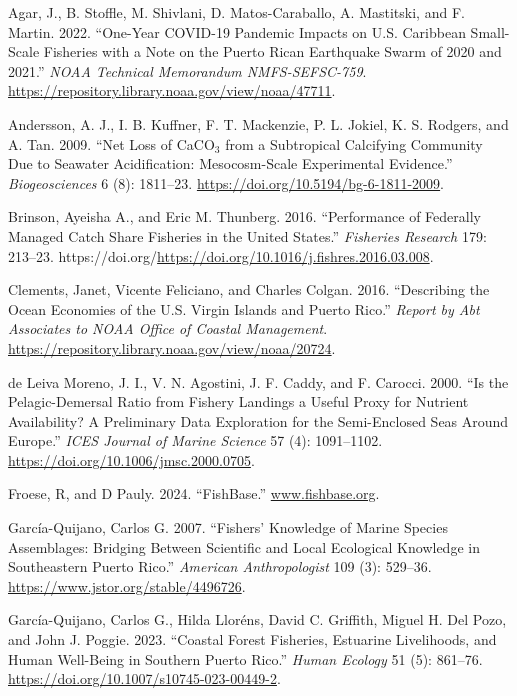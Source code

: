 \documentclass[
  letterpaper,
  oneside,
  open=any]{scrbook}
\newlength{\cslhangindent}
\newenvironment{CSLReferences}[2] %
 {\begin{list}{}{%
  \setlength{\itemindent}{0pt}
  \setlength{\leftmargin}{0pt}
  \setlength{\parsep}{0pt}
  \ifodd #1
   \setlength{\leftmargin}{\cslhangindent}
   \setlength{\itemindent}{-1\cslhangindent}
  \fi
  \setlength{\itemsep}{#2\baselineskip}}}
 {\end{list}}
\begin{document}
\label{refs}
\begin{CSLReferences}{1}{0}
Agar, J., B. Stoffle, M. Shivlani, D. Matos-Caraballo, A. Mastitski, and
F. Martin. 2022. {``One-Year COVID-19 Pandemic Impacts on U.S. Caribbean
Small-Scale Fisheries with a Note on the Puerto Rican Earthquake Swarm
of 2020 and 2021.''} \emph{NOAA Technical Memorandum NMFS-SEFSC-759}.
\url{https://repository.library.noaa.gov/view/noaa/47711}.

Andersson, A. J., I. B. Kuffner, F. T. Mackenzie, P. L. Jokiel, K. S.
Rodgers, and A. Tan. 2009. {``Net Loss of CaCO\(_{3}\) from a
Subtropical Calcifying Community Due to Seawater Acidification:
Mesocosm-Scale Experimental Evidence.''} \emph{Biogeosciences} 6 (8):
1811--23. \url{https://doi.org/10.5194/bg-6-1811-2009}.

Brinson, Ayeisha A., and Eric M. Thunberg. 2016. {``Performance of
Federally Managed Catch Share Fisheries in the United States.''}
\emph{Fisheries Research} 179: 213--23.
https://doi.org/\url{https://doi.org/10.1016/j.fishres.2016.03.008}.

Clements, Janet, Vicente Feliciano, and Charles Colgan. 2016.
{``Describing the Ocean Economies of the U.S. Virgin Islands and Puerto
Rico.''} \emph{Report by Abt Associates to NOAA Office of Coastal
Management}. \url{https://repository.library.noaa.gov/view/noaa/20724}.

de Leiva Moreno, J. I., V. N. Agostini, J. F. Caddy, and F. Carocci.
2000. {``Is the Pelagic-Demersal Ratio from Fishery Landings a Useful
Proxy for Nutrient Availability? A Preliminary Data Exploration for the
Semi-Enclosed Seas Around Europe.''} \emph{ICES Journal of Marine
Science} 57 (4): 1091--1102.
\url{https://doi.org/10.1006/jmsc.2000.0705}.

Froese, R, and D Pauly. 2024. {``FishBase.''}
\href{https://www.fishbase.org}{www.fishbase.org}.

García-Quijano, Carlos G. 2007. {``Fishers' Knowledge of Marine Species
Assemblages: Bridging Between Scientific and Local Ecological Knowledge
in Southeastern Puerto Rico.''} \emph{American Anthropologist} 109 (3):
529--36. \url{https://www.jstor.org/stable/4496726}.

García-Quijano, Carlos G., Hilda Lloréns, David C. Griffith, Miguel H.
Del Pozo, and John J. Poggie. 2023. {``Coastal Forest Fisheries,
Estuarine Livelihoods, and Human Well-Being in Southern Puerto Rico.''}
\emph{Human Ecology} 51 (5): 861--76.
\url{https://doi.org/10.1007/s10745-023-00449-2}.


\end{CSLReferences}
\end{document}
